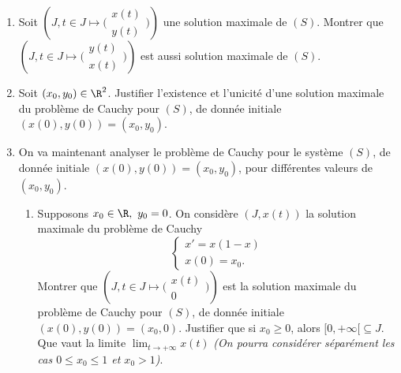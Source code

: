 \begin{enumerate}
  \item Soit $\left(J,t\in J\mapsto \Big(\begin{array}{c}x(t)\\y(t)\end{array}\Big)\right)$ une solution maximale de $(S)$. Montrer que $\left(J,t\in J\mapsto\Big(\begin{array}{c}y(t)\\x(t)\end{array}\Big)\right)$ est aussi solution maximale de $(S)$.
  \item Soit $(x_0,y_0)\in\R^2$. Justifier l'existence et l'unicité d'une solution maximale du problème de Cauchy pour $(S)$, de donnée initiale $(x(0),y(0))=(x_0,y_0)$.
\item On va maintenant analyser le problème de Cauchy pour le système $(S)$, de donnée initiale $(x(0),y(0))=(x_0,y_0)$, pour différentes valeurs de $(x_0,y_0)$.
  \begin{enumerate}
  \item Supposons $x_0\in\R,\ y_0=0$. On considère $(J,x(t))$ la solution maximale du problème de Cauchy
  $$
  \begin{cases}
    x'=x(1-x)\\
    x(0)=x_0.
  \end{cases}
  $$
Montrer que $\left(J,t\in J\mapsto \Big(\begin{array}{c}x(t)\\0\end{array}\Big)\right)$ est la solution maximale du problème de Cauchy pour $(S)$, de donnée initiale $(x(0),y(0))=(x_0,0)$. Justifier que si $x_0\geq0$, alors $[0,+\infty[\subseteq J$. Que vaut la limite $\lim_{t\to+\infty}x(t)$ {\it (On pourra considérer séparément les cas $0\leq x_0\leq 1$ et $x_0>1$)}.

\end{enumerate}
\end{enumerate}
